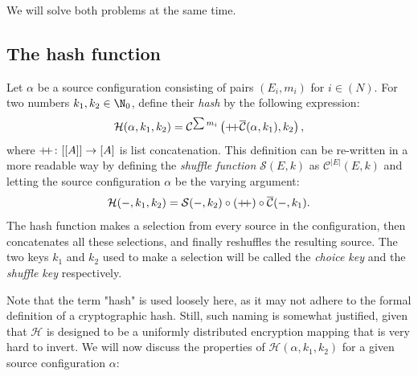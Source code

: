 \documentclass[12pt, a4paper]{article}
\renewcommand{\C}{\mathcal{C}}
\newcommand{\CC}{\overline{\mathcal{C}}}
\renewcommand{\H}{\mathcal{H}}
\renewcommand{\S}{\mathcal{S}}
\newcommand{\dop}{\mathbin{{+}\hspace{-1mm}{+}}}
\begin{document}
We will solve both problems at the same time.

\subsection{The hash function}

\begin{definition}
    Let $ \alpha $ be a source configuration consisting of pairs $ (E_i, m_i) $ for $ i \in (N) $. For two numbers $ k_1, k_2 \in \N_0 $, define their \emph{hash} by the following expression:
    \[ \H(\alpha, k_1, k_2) = \C^{\sum m_i}\left(\dop\CC(\alpha, k_1), k_2\right), \]
    where $ \dop \colon [[A]] \to [A] $ is list concatenation. This definition can be re-written in a more readable way by defining the \emph{shuffle function} $ \S(E, k) $ as $ \C^{|E|}(E, k) $ and letting the source configuration $ \alpha $ be the varying argument:
    \[ \H(-, k_1, k_2) = \S(-, k_2) \circ (\dop) \circ \CC(-, k_1). \]
    The hash function makes a selection from every source in the configuration, then concatenates all these selections, and finally reshuffles the resulting source. The two keys $ k_1 $ and $ k_2 $ used to make a selection will be called the \emph{choice key} and the \emph{shuffle key} respectively.
\end{definition}

Note that the term "hash" is used loosely here, as it may not adhere to the formal definition of a cryptographic hash. Still, such naming is somewhat justified, given that $ \H $ is designed to be a uniformly distributed encryption mapping that is very hard to invert. We will now discuss the properties of $ \H(\alpha, k_1, k_2) $ for a given source configuration $ \alpha $:
\end{document}
